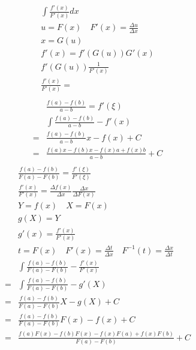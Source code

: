 \documentclass{article}
\begin{document}
  \begin{align}
    \begin{aligned}
      \int \frac{f'(x)}{F'(x)} dx \\
      u = F(x) \quad F'(x) = \frac{\Delta{u}}{\Delta{x}} \\
      x = G(u) \\
      f'(x) = f'(G(u))G'(x) \\
      f'(G(u)) \frac{1}{F'(x)} \\
      \frac{f'(x)}{F'(x)} = 
    \end{aligned}
  \end{align}
  \begin{align}
    \begin{aligned} %
      & \frac{f\left( a \right) - f\left(b\right)}{a - b} = f'\left( \xi  \right) \\
      & \int \frac{f\left( a \right) - f\left(b\right)}{a - b} - f'\left( x  \right) \\
      =& \frac{f\left( a \right) - f\left(b\right)}{a - b} x - f\left( x \right) + C \\
      =& \frac{f\left( a \right) x - f\left(b\right) x - f\left(x\right) a + f\left(x\right) b}{a - b} + C
    \end{aligned}
  \end{align}
  \begin{align}
    \begin{aligned} %
      & \frac{f\left( a \right) - f\left(b\right)}{F\left(a\right) - F\left(b\right)} = \frac{f'\left( \xi  \right)}{F'\left( \xi \right)} \\
      & \frac{f'(x)}{F'(x)} = \frac{\Delta{f(x)}}{\Delta{x}} \frac{\Delta{x}}{\Delta{F(x)}} \\
      & Y = f(x) \quad X = F(x) \\
      & g(X) = Y \\
      & g'(x) = \frac{f'(x)}{F'(x)} \\
      & t = F(x) \quad F'(x) = \frac{\Delta{t}}{\Delta{x}} \quad F^{-1}(t) = \frac{\Delta{x}}{\Delta{t}} \\
      & \int \frac{f\left( a \right) - f\left(b\right)}{F\left(a\right) - F\left(b\right)} - \frac{f'\left( x \right)}{F'\left( x \right)} \\
      = & \int \frac{f\left( a \right) - f\left(b\right)}{F\left(a\right) - F\left(b\right)} - g'(X) \\
      = & \frac{f\left( a \right) - f\left(b\right)}{F\left(a\right) - F\left(b\right)} X - g(X) + C \\
      = & \frac{f\left( a \right) - f\left(b\right)}{F\left(a\right) - F\left(b\right)} F(x) - f(x) + C \\
      = & \frac{f\left( a \right) F(x) - f\left(b\right) F(x) - f\left(x\right) F(a) + f\left(x\right) F(b)}{F(a) - F(b)} + C
     \end{aligned}
  \end{align}
\end{document}
